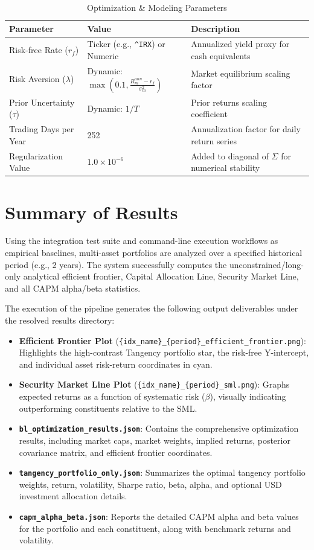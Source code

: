 \documentclass[11pt,a4paper]{article}
\begin{document}
\begin{table}[h]
\centering
\caption{Optimization \& Modeling Parameters}
\label{tab:params}
\begin{tabular}{lll}
\toprule
\textbf{Parameter} & \textbf{Value} & \textbf{Description} \\
\midrule
Risk-free Rate ($r_f$) & Ticker (e.g., \texttt{\^{}IRX}) or Numeric & Annualized yield proxy for cash equivalents \\
Risk Aversion ($\lambda$) & Dynamic: $\max\left(0.1, \frac{R_m^{ann} - r_f}{\sigma_m^2}\right)$ & Market equilibrium scaling factor \\
Prior Uncertainty ($\tau$) & Dynamic: $1 / T$ & Prior returns scaling coefficient \\
Trading Days per Year & 252 & Annualization factor for daily return series \\
Regularization Value & $1.0 \times 10^{-6}$ & Added to diagonal of $\Sigma$ for numerical stability \\
\bottomrule
\end{tabular}
\end{table}

\section{Summary of Results}

Using the integration test suite and command-line execution workflows as empirical baselines, multi-asset portfolios are analyzed over a specified historical period (e.g., 2 years).
The system successfully computes the unconstrained/long-only analytical efficient frontier, Capital Allocation Line, Security Market Line, and all CAPM alpha/beta statistics.

The execution of the pipeline generates the following output deliverables under the resolved results directory:
\begin{itemize}
    \item \textbf{Efficient Frontier Plot} (\texttt{\{idx\_name\}\_\{period\}\_efficient\_frontier.png}): Highlights the high-contrast Tangency portfolio star, the risk-free Y-intercept, and individual asset risk-return coordinates in cyan.
    \item \textbf{Security Market Line Plot} (\texttt{\{idx\_name\}\_\{period\}\_sml.png}): Graphs expected returns as a function of systematic risk ($\beta$), visually indicating outperforming constituents relative to the SML.
    \item \textbf{\texttt{bl\_optimization\_results.json}}: Contains the comprehensive optimization results, including market caps, market weights, implied returns, posterior covariance matrix, and efficient frontier coordinates.
    \item \textbf{\texttt{tangency\_portfolio\_only.json}}: Summarizes the optimal tangency portfolio weights, return, volatility, Sharpe ratio, beta, alpha, and optional USD investment allocation details.
    \item \textbf{\texttt{capm\_alpha\_beta.json}}: Reports the detailed CAPM alpha and beta values for the portfolio and each constituent, along with benchmark returns and volatility.
\end{itemize}
\end{document}
